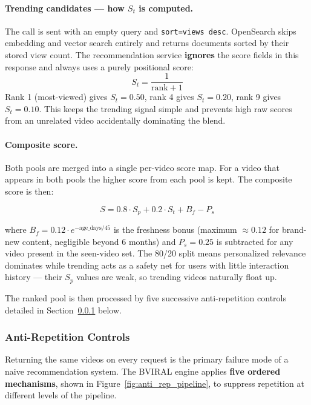 \paragraph{Trending candidates — how $S_t$ is computed.}
The call is sent with an empty query and \texttt{sort=views\,desc}. OpenSearch skips
embedding and vector search entirely and returns documents sorted by their stored view count.
The recommendation service \textbf{ignores} the score fields in this response and always
uses a purely positional score:
\[
  S_t = \frac{1}{\text{rank}+1}
\]
Rank 1 (most-viewed) gives $S_t = 0.50$, rank 4 gives $S_t = 0.20$, rank 9 gives
$S_t = 0.10$. This keeps the trending signal simple and prevents high raw scores from an
unrelated video accidentally dominating the blend.

\paragraph{Composite score.}
Both pools are merged into a single per-video score map. For a video that appears in both
pools the higher score from each pool is kept. The composite score is then:

\[
  S = 0.8 \cdot S_p + 0.2 \cdot S_t + B_f - P_s
\]

where $B_f = 0.12 \cdot e^{-\text{age\_days}/45}$ is the freshness bonus (maximum $\approx
0.12$ for brand-new content, negligible beyond 6 months) and $P_s = 0.25$ is subtracted for
any video present in the seen-video set. The 80/20 split means personalized relevance
dominates while trending acts as a safety net for users with little interaction history —
their $S_p$ values are weak, so trending videos naturally float up.

The ranked pool is then processed by five successive anti-repetition controls detailed in
Section~\ref{sec:anti_rep} below.

\subsubsection{Anti-Repetition Controls}
\label{sec:anti_rep}

Returning the same videos on every request is the primary failure mode of a naive recommendation
system. The BVIRAL engine applies \textbf{five ordered mechanisms}, shown in
Figure~\ref{fig:anti_rep_pipeline}, to suppress repetition at different levels of
the pipeline.

